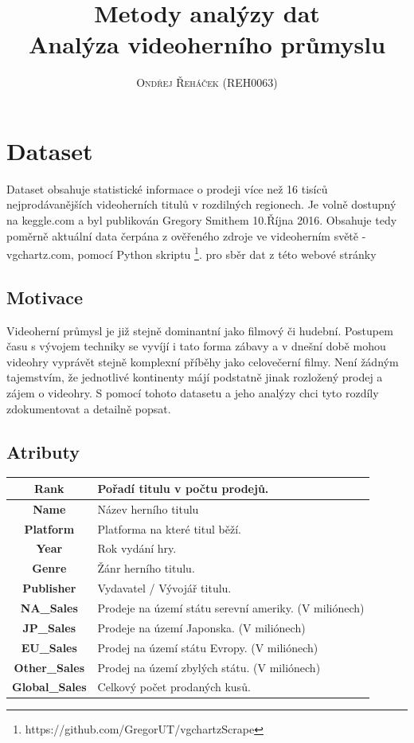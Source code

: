 \documentclass[a4paper,11pt]{article}
\title{\Huge \textbf{Metody analýzy dat}  
\\ \huge Analýza videoherního průmyslu }
\author{\textsc{Ondřej Řeháček (REH0063)}}
\begin{document}
\maketitle

\section{Dataset}
Dataset obsahuje statistické informace o prodeji více než 16 tisíců nejprodávanějších videoherních titulů v rozdilných regionech. Je volně dostupný na keggle.com a byl publikován Gregory Smithem 10.Října 2016. Obsahuje tedy poměrně aktuální data čerpána z ověřeného zdroje ve videoherním světě - vgchartz.com, pomocí Python skriptu \footnote{https://github.com/GregorUT/vgchartzScrape}. pro sběr dat z této webové stránky 

\subsection{Motivace}
Videoherní průmysl je již stejně dominantní jako filmový či hudební. Postupem času s vývojem techniky se vyvíjí i tato forma zábavy a v dnešní době mohou videohry vyprávět stejně komplexní příběhy jako celovečerní filmy. Není žádným tajemstvím, že jednotlivé kontinenty májí podstatně jinak rozložený prodej a zájem o videohry. S pomocí tohoto datasetu a jeho analýzy chci tyto rozdíly zdokumentovat a detailně popsat.

\subsection{Atributy}
\begin{tabular}{|c|l|}
\hline
\textbf{Rank} & Pořadí titulu v počtu prodejů. \\ \hline
\textbf{Name} & Název herního titulu \\ \hline
\textbf{Platform} & Platforma na které titul běží. \\ \hline
\textbf{Year} & Rok vydání hry. \\ \hline
\textbf{Genre} & Žánr herního titulu. \\ \hline
\textbf{Publisher} & Vydavatel / Vývojář titulu. \\ \hline
\textbf{NA\_Sales} & Prodeje na území státu serevní ameriky. (V miliónech) \\ \hline
\textbf{JP\_Sales} & Prodeje na území Japonska. (V miliónech) \\ \hline
\textbf{EU\_Sales} & Prodej na území státu Evropy. (V miliónech) \\ \hline
\textbf{Other\_Sales} & Prodej na území zbylých státu. (V miliónech) \\ \hline
\textbf{Global\_Sales} & Celkový počet prodaných kusů. \\ \hline
\end{tabular}
\end{document}
